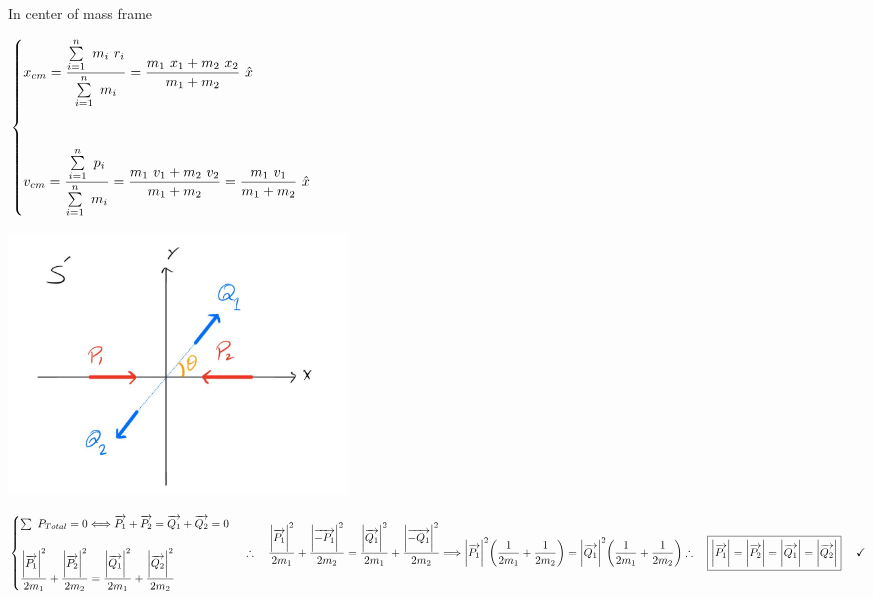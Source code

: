 \documentclass[fleqn]{article}
\begin{document}
In center of mass frame

$
  \\
  \begin{cases}
    x_{cm}=\dfrac{
      \sum\limits_{i=1}^{n} ~ m_i ~ r_i
    }{
      \sum\limits_{i=1}^{n} ~ m_i
    }=\dfrac{m_1 ~ x_1+m_2 ~ x_2}{m_1+m_2} ~ \hat{x}
    \\
    \\
    \\
    v_{cm}=\dfrac{
      \sum\limits_{i=1}^{n} ~ p_i
    }{
      \sum\limits_{i=1}^{n} ~ m_i
    }=\dfrac{m_1 ~ v_1+m_2 ~ v_2}{m_1+m_2}=\dfrac{m_1 ~ v_1}{m_1+m_2} ~ \hat{x}
  \end{cases}
$

\begin{center}
  \includegraphics[height=7cm, width=9cm]{4.JPG}
\end{center}

$
  \begin{cases}
    \sum\limits ~ P_{Total}=0 \Longleftrightarrow \overrightarrow{P_1}+\overrightarrow{P_2}=\overrightarrow{Q_1}+\overrightarrow{Q_2}=0
    \\
    \\
    \dfrac{\bigg|\overrightarrow{P_1}\bigg|^2}{2m_1}+\dfrac{\bigg|\overrightarrow{P_2}\bigg|^2}{2m_2}
    =\dfrac{\bigg|\overrightarrow{Q_1}\bigg|^2}{2m_1}+\dfrac{\bigg|\overrightarrow{Q_2}\bigg|^2}{2m_2}
  \end{cases}
  \\
  \\
  \\
  \\
  \therefore ~~~ \dfrac{\bigg|\overrightarrow{P_1}\bigg|^2}{2m_1}+\dfrac{\bigg|\overrightarrow{-P_1}\bigg|^2}{2m_2}
  =\dfrac{\bigg|\overrightarrow{Q_1}\bigg|^2}{2m_1}+\dfrac{\bigg|\overrightarrow{-Q_1}\bigg|^2}{2m_2}
  \Longrightarrow
  \bigg|\overrightarrow{P_1}\bigg|^2 \bigg(\dfrac{1}{2m_1}+\dfrac{1}{2m_2} \bigg)
  =\bigg|\overrightarrow{Q_1}\bigg|^2 \bigg(\dfrac{1}{2m_1}+\dfrac{1}{2m_2} \bigg)
  \\
  \\
  \\
  \therefore ~~~ \boxed{
    \bigg|\overrightarrow{P_1}\bigg|
    =\bigg|\overrightarrow{P_2}\bigg|
    =\bigg|\overrightarrow{Q_1}\bigg|
    =\bigg|\overrightarrow{Q_2}\bigg|
  } ~~~~ \checkmark
$
\end{document}
